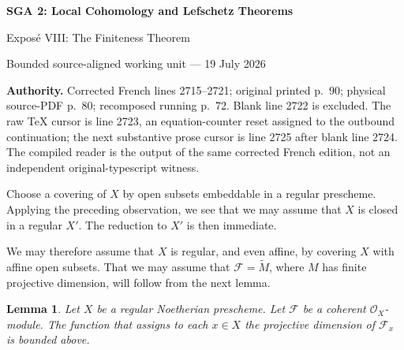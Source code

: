 \documentclass[10pt,a4paper]{article}
\newcommand{\cF}{\mathcal F}
\newtheorem{lemma}{Lemma}[section]
\begin{document}
\setcounter{section}{2}
\setcounter{lemma}{3}
\begin{center}
  {\Large\bfseries SGA 2: Local Cohomology and Lefschetz Theorems}\par\smallskip
  {\large Expos\'e VIII: The Finiteness Theorem}\par
  \small Bounded source-aligned working unit --- 19 July 2026
\end{center}
\noindent\colorbox{softgray}{\parbox{0.95\linewidth}{\footnotesize\textbf{Authority.}
Corrected French lines 2715--2721; original printed p.~90; physical
source-PDF p.~80; recomposed running p.~72. Blank line 2722 is excluded.
The raw TeX cursor is line 2723, an equation-counter reset assigned to the
outbound continuation; the next substantive prose cursor is line 2725 after
blank line 2724. The compiled reader is the output of the same corrected
French edition, not an independent original-typescript witness.}}

\medskip
Choose a covering of $X$ by open subsets embeddable in a regular prescheme.
Applying the preceding observation, we see that we may assume that $X$ is
closed in a regular $X'$. The reduction to $X'$ is then immediate.

We may therefore assume that $X$ is regular, and even affine, by covering
$X$ with affine open subsets. That we may assume that $\cF=\widetilde M$, where
$M$ has finite projective dimension, will follow from the next lemma.

\begin{lemma}\label{VIII.2.4}
Let $X$ be a regular Noetherian prescheme. Let $\cF$ be a coherent
$\mathcal O_X$-module. The function that assigns to each $x\in X$ the
projective dimension of $\cF_x$ is bounded above.
\end{lemma}
\end{document}
